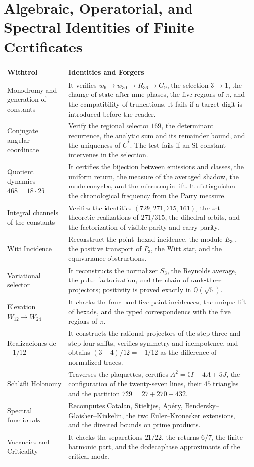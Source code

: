 \section{Algebraic, Operatorial, and Spectral Identities of Finite Certificates}

\begin{longtable}{@{}>{\raggedright\arraybackslash}p{}
  >{\raggedright\arraybackslash}p{}@{}}
\toprule
Withtrol & Identities and Forgers\\
\midrule
\endhead
Monodromy and generation of constants
& It verifies \(w_6\to w_{30}\to R_{36}\to G_9\), the selection \(3\to1\),
the change of state after nine phases, the five regions of \(\pi\), and the
compatibility of truncations. It fails if a target digit is introduced
before the reader.\\
Conjugate angular coordinate
& Verify the regional selector \(169\), the determinant recurrence, the
analytic sum and its remainder bound, and the uniqueness of \(C^*\). The test fails if an
SI constant intervenes in the selection.\\
Quotient dynamics \(468=18\cdot26\)
& It certifies the bijection between emissions and classes, the uniform return, the
measure of the averaged shadow, the mode cocycles, and the
microscopic lift. It distinguishes the chronological frequency from the Parry measure.\\
Integral channels of the constants
& Verifies the identities \((729,271,315,161)\), the set-theoretic
realizations of \(271/315\), the dihedral orbits, and the factorization of
visible parity and carry parity.\\
Witt Incidence
& Reconstruct the point--hexad incidence, the module \(E_{30}\), the
positive transport of \(P_3\), the Witt star, and the equivariance
obstructions.\\
Variational selector
& It reconstructs the normalizer \(S_3\), the Reynolds average, the
polar factorization, and the chain of rank-three projectors; positivity
is proved exactly in \(\mathbb Q(\sqrt5)\).\\
Elevation \(W_{12}\to W_{24}\)
& It checks the four- and five-point incidences, the unique lift of
hexads, and the typed correspondence with the five regions of \(\pi\).\\
Realizaciones de \(-1/12\)
& It constructs the rational projectors of the step-three and step-four
shifts, verifies symmetry and idempotence, and obtains \((3-4)/12=-1/12\) as the
difference of normalized traces.\\
Schläfli Holonomy
& Traverses the plaquettes, certifies \(A^2=5I-4A+5J\), the configuration of the
twenty-seven lines, their \(45\) triangles and the partition
\(729=27+270+432\).\\
Spectral functionals
& Recomputes Catalan, Stieltjes, Apéry, Bendersky--Glaisher--Kinkelin, the
two Euler--Kronecker extensions, and the directed bounds on prime products.\\
Vacancies and Criticality
& It checks the separations \(21/22\), the returns \(6/7\), the finite
harmonic part, and the dodecaphase approximants of the critical mode.\\
\bottomrule
\end{longtable}

